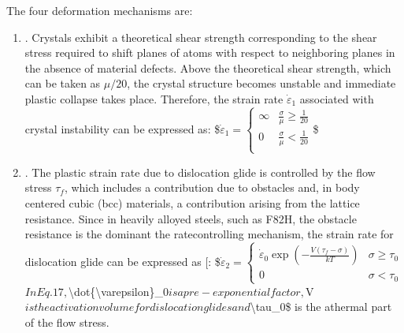 \documentclass[letterpaper,10pt,english]{jupyterBook}
\begin{document}
	\sphinxAtStartPar
	The four deformation mechanisms are: 
	\begin{enumerate}
		\item {} 
		\sphinxAtStartPar
		. Crystals exhibit a theoretical shear strength corresponding to the shear stress required to shift planes of atoms with respect to neighboring planes in the absence of material defects. Above the theoretical shear strength, which can be taken as \(\mu/20\), the crystal structure becomes unstable and immediate plastic collapse takes place. Therefore, the strain rate \(\dot{\varepsilon}_{1}\) associated with crystal instability can be expressed as:
		\$\(\dot{\varepsilon}_1=\left\{\begin{array}{ll}
			\infty&\frac{\sigma}{\mu}\ge \frac{1}{20}\\
			0&\frac{\sigma}{\mu}< \frac{1}{20}\\
		\end{array}\right.\)\$
		
		\item {} 
		\sphinxAtStartPar
		. The plastic strain rate due to dislocation glide is controlled by the flow stress \(\tau_f\), which includes a contribution due to obstacles and, in body centered cubic (bcc) materials, a contribution arising from the lattice resistance. Since in heavily alloyed steels, such as F82H, the obstacle resistance is the dominant the rate\sphinxhyphen{}controlling mechanism, the strain rate for dislocation glide can be expressed as {[}\sphinxhref{https://drive.google.com/file/d/1APELUCmPwMVPnGgeBDs-uroUFJODEYKi/view?usp=drive\_link}{Ashby1972}{]}:
		\$\(\dot{\varepsilon}_2=
		\begin{cases}
			\dot{\varepsilon}_0\exp\left(-\frac{V(\tau_f-\sigma)}{kT}\right)&\sigma\ge \tau_0\\
			0&\sigma < \tau_0
		\end{cases}\)\(
		In Eq. 17, \)\textbackslash{}dot\{\textbackslash{}varepsilon\}\_0\( is a pre-exponential factor, \)V\( is the activation volume for dislocation glides and \)\textbackslash{}tau\_0\$ is the athermal part of the flow stress.
		
	\end{enumerate}
	
\end{document}
